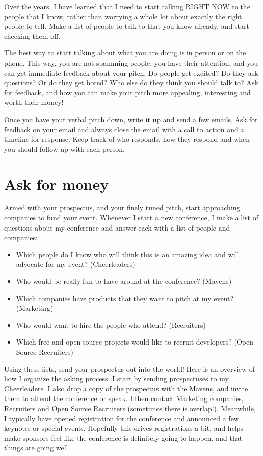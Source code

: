 Over the years, I have learned that I need to start talking RIGHT NOW to the people that I know, rather than worrying a whole lot about exactly the right people to tell.  Make a list of people to talk to that you know already, and start checking them off.

The best way to start talking about what you are doing is in person or on the phone. This way, you are not spamming people, you have their attention, and you can get immediate feedback about your pitch. Do people get excited? Do they ask questions? Or do they get bored? Who else do they think you should talk to? Ask for feedback, and how you can make your pitch more appealing, interesting and worth their money!

Once you have your verbal pitch down, write it up and send a few emails. Ask for feedback on your email and always close the email with a call to action and a timeline for response.  Keep track of who responds, how they respond and when you should follow up with each person.

\section*{Ask for money}
Armed with your prospectus, and your finely tuned pitch, start approaching companies to fund your event. Whenever I start a new conference, I make a list of questions about my conference and answer each with a list of people and companies: 
\begin{itemize}
\item Which people do I know who will think this is an amazing idea and will advocate for my event? (Cheerleaders)
\item Who would be really fun to have around at the conference? (Mavens)
\item Which companies have products that they want to pitch at my event? (Marketing)
\item Who would want to hire the people who attend? (Recruiters)
\item Which free and open source projects would like to recruit developers? (Open Source Recruiters)
\end{itemize}

Using these lists, send your prospectus out into the world! Here is an overview of how I organize the asking process: 
I start by sending prospectuses to my Cheerleaders. I also drop a copy of the prospectus with the Mavens, and invite them to attend the conference or speak. I then contact Marketing companies, Recruiters and Open Source Recruiters (sometimes there is overlap!).
Meanwhile, I typically have opened registration for the conference and announced a few keynotes or special events. Hopefully this drives registrations a bit, and helps make sponsors feel like the conference is definitely going to happen, and that things are going well.

